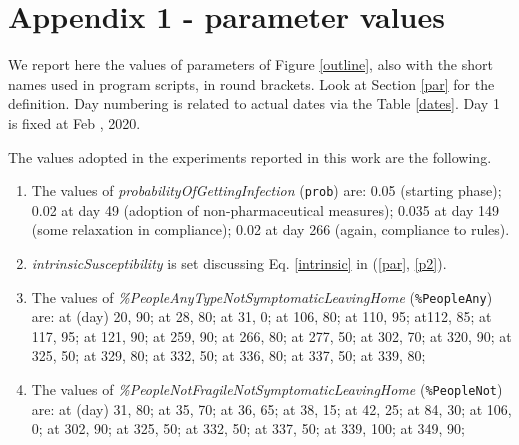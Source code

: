 \documentclass[graybox]{svmult}
\begin{document}
\section{Appendix 1 - parameter values}
\label{app1}

We report here the values of parameters of Figure \ref{outline}, also with the short names used in program scripts, in round brackets. Look at Section \ref{par} for the definition. Day numbering is related to actual dates via the Table \ref{dates}. Day 1 is fixed at Feb , 2020.

The values adopted in the experiments reported in this work are the following.

\begin{enumerate}[label=\roman*]

\item \label{pp1} The values of \emph{probabilityOfGettingInfection} (\verb|prob|) are: 0.05 (starting phase); 0.02 at day 49 (adoption of non-pharmaceutical measures); 0.035 at day 149 (some relaxation in compliance); 0.02 at day 266 (again, compliance to rules).  

\item \label{pp2} \emph{intrinsicSusceptibility} is set discussing Eq. \ref{intrinsic} in (\ref{par}, \ref{p2}).


\item \label{pp3} The values of \emph{\%PeopleAnyTypeNotSymptomaticLeavingHome} (\verb|%PeopleAny|) are:
at (day) 20, 90; at 28, 80; at 31, 0; at 106, 80; at 110, 95; at112, 85; at 117, 95; at 121, 90; at 259, 90; at 266, 80; at 277, 50;
at 302, 70; at 320, 90; at 325, 50; at 329, 80; at 332, 50; at 336, 80; at 337, 50; at 339, 80; 

\item \label{pp4} The values of \emph{\%PeopleNotFragileNotSymptomaticLeavingHome} (\verb|%PeopleNot|) are:
at (day) 31, 80; at 35, 70; at 36, 65; at 38, 15; at 42, 25; at 84, 30; at 106, 0; at 302, 90; at 325, 50; at 332, 50; 
at 337, 50; at 339, 100; at 349, 90;


\end{enumerate}
\end{document}
